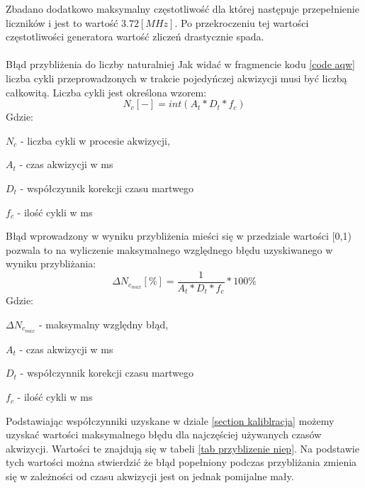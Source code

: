 Zbadano dodatkowo maksymalny częstotliwość dla której następuje przepełnienie liczników i jest to wartość $3.72 [MHz]$. Po przekroczeniu tej wartości częstotliwości generatora wartość zliczeń drastycznie spada. 

\paragraph{}{Błąd przybliżenia do liczby naturalniej}
Jak widać w fragmencie kodu \ref{code aqw} liczba cykli przeprowadzonych w trakcie pojedyńczej akwizycji musi być liczbą całkowitą. Liczba cykli jest określona wzorem:
\begin{equation}
        N_c [-] = int(A_t*D_t*f_c)
\end{equation}
Gdzie:
\begin{description}
        \item $N_c$ - liczba cykli w procesie akwizycji,
        \item $A_t$ - czas  akwizycji w ms
        \item $D_t$ - współczynnik korekcji czasu martwego 
        \item $f_c$ - ilość cykli w ms
\end{description}

Błąd wprowadzony w wyniku przybliżenia mieści się w przedziale wartości [0,1) pozwala to na wyliczenie maksymalnego względnego błędu uzyskiwanego w wyniku przybliżania:
\begin{equation}
        \Delta N_{c_{max}} [\%] = \frac{1}{A_t*D_t*f_c}  * 100\%
\end{equation} 
Gdzie:
\begin{description}
        \item $\Delta N_{c_{max}}$ - maksymalny względny błąd,
        \item $A_t$ - czas  akwizycji w ms
        \item $D_t$ - współczynnik korekcji czasu martwego 
        \item $f_c$ - ilość cykli w ms
\end{description}

Podstawiając współczynniki uzyskane w dziale \ref{section kaliblracja} możemy uzyskać wartości maksymalnego błędu dla najczęściej używanych czasów akwizycji. Wartości te znajdują się w tabeli \ref{tab przyblizenie niep}. Na podstawie tych wartości można stwierdzić że błąd popełniony podczas przybliżania zmienia się w zależności od czasu akwizycji jest on jednak pomijalne mały.

